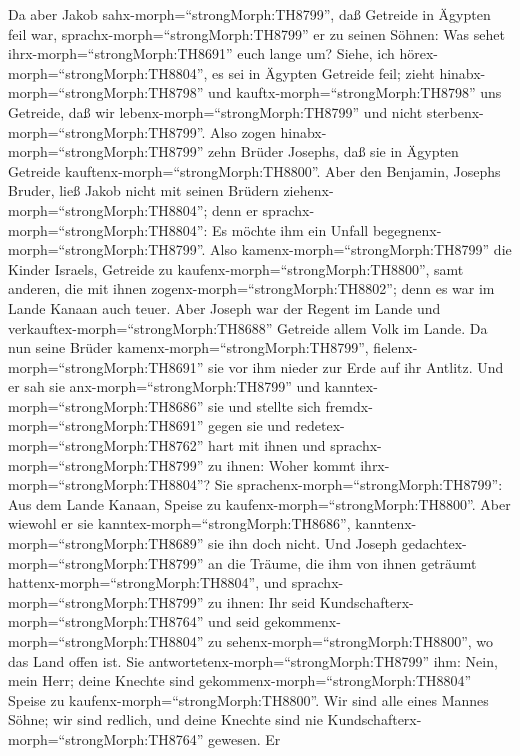  Da aber Jakob sahx-morph=``strongMorph:TH8799'', daß
Getreide in Ägypten feil war, sprachx-morph=``strongMorph:TH8799'' er zu
seinen Söhnen: Was sehet ihrx-morph=``strongMorph:TH8691'' euch lange
um?  Siehe, ich hörex-morph=``strongMorph:TH8804'', es sei
in Ägypten Getreide feil; zieht hinabx-morph=``strongMorph:TH8798'' und
kauftx-morph=``strongMorph:TH8798'' uns Getreide, daß wir
lebenx-morph=``strongMorph:TH8799'' und nicht
sterbenx-morph=``strongMorph:TH8799''.  Also zogen
hinabx-morph=``strongMorph:TH8799'' zehn Brüder Josephs, daß sie in
Ägypten Getreide kauftenx-morph=``strongMorph:TH8800''. 
Aber den Benjamin, Josephs Bruder, ließ Jakob nicht mit seinen Brüdern
ziehenx-morph=``strongMorph:TH8804''; denn er
sprachx-morph=``strongMorph:TH8804'': Es möchte ihm ein Unfall
begegnenx-morph=``strongMorph:TH8799''.  Also
kamenx-morph=``strongMorph:TH8799'' die Kinder Israels, Getreide zu
kaufenx-morph=``strongMorph:TH8800'', samt anderen, die mit ihnen
zogenx-morph=``strongMorph:TH8802''; denn es war im Lande Kanaan auch
teuer.  Aber Joseph war der Regent im Lande und
verkauftex-morph=``strongMorph:TH8688'' Getreide allem Volk im Lande. Da
nun seine Brüder kamenx-morph=``strongMorph:TH8799'',
fielenx-morph=``strongMorph:TH8691'' sie vor ihm nieder zur Erde auf ihr
Antlitz.  Und er sah sie anx-morph=``strongMorph:TH8799''
und kanntex-morph=``strongMorph:TH8686'' sie und stellte sich
fremdx-morph=``strongMorph:TH8691'' gegen sie und
redetex-morph=``strongMorph:TH8762'' hart mit ihnen und
sprachx-morph=``strongMorph:TH8799'' zu ihnen: Woher kommt
ihrx-morph=``strongMorph:TH8804''? Sie
sprachenx-morph=``strongMorph:TH8799'': Aus dem Lande Kanaan, Speise zu
kaufenx-morph=``strongMorph:TH8800''.  Aber wiewohl er sie
kanntex-morph=``strongMorph:TH8686'',
kanntenx-morph=``strongMorph:TH8689'' sie ihn doch nicht. 
Und Joseph gedachtex-morph=``strongMorph:TH8799'' an die Träume, die ihm
von ihnen geträumt hattenx-morph=``strongMorph:TH8804'', und
sprachx-morph=``strongMorph:TH8799'' zu ihnen: Ihr seid
Kundschafterx-morph=``strongMorph:TH8764'' und seid
gekommenx-morph=``strongMorph:TH8804'' zu
sehenx-morph=``strongMorph:TH8800'', wo das Land offen ist.
 Sie antwortetenx-morph=``strongMorph:TH8799'' ihm: Nein,
mein Herr; deine Knechte sind gekommenx-morph=``strongMorph:TH8804''
Speise zu kaufenx-morph=``strongMorph:TH8800''.  Wir sind
alle eines Mannes Söhne; wir sind redlich, und deine Knechte sind nie
Kundschafterx-morph=``strongMorph:TH8764'' gewesen.  Er
